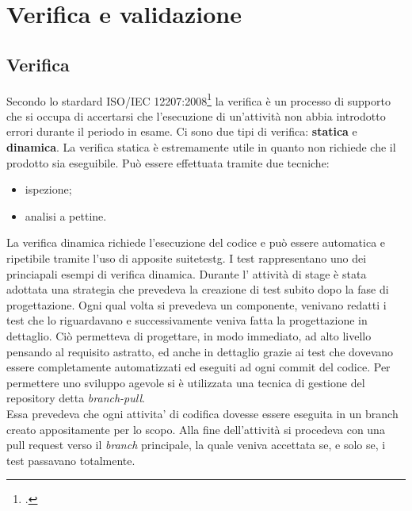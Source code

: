 
\chapter{Verifica e validazione}
\label{cap:verifica-validazione}
\section{Verifica}
Secondo lo stardard ISO/IEC 12207:2008\footcite{ISO:Systems-and-software-engineering} la verifica è un processo di supporto che si occupa di accertarsi che l’esecuzione di un'attività non abbia introdotto errori durante il periodo in esame. 
Ci sono due tipi di verifica: \textbf{statica} e \textbf{dinamica}.
La verifica statica è estremamente utile in quanto non richiede che il prodotto sia eseguibile. Può essere effettuata tramite due tecniche:
\begin{itemize}
    \item ispezione;
    \item analisi a pettine.
\end{itemize}
La verifica dinamica richiede l'esecuzione del codice e può essere automatica e ripetibile tramite l'uso di apposite \gls{suitetestg}\glsfirstoccur. I test rappresentano uno dei princiapali esempi di verifica dinamica. Durante l' attività di stage è stata adottata una strategia che prevedeva la creazione di test subito dopo la fase di progettazione. Ogni qual volta si prevedeva un componente, venivano redatti i test che lo riguardavano e successivamente veniva fatta la progettazione in dettaglio. Ciò permetteva di progettare, in modo immediato, ad alto livello pensando al requisito astratto, ed anche in dettaglio grazie ai test che dovevano essere completamente automatizzati ed eseguiti ad ogni commit del codice. 
Per permettere uno sviluppo agevole si è utilizzata una tecnica di gestione del repository detta \emph{branch-pull}.\\
Essa prevedeva che ogni attivita’ di codifica dovesse essere eseguita in un branch creato appositamente per lo scopo. Alla fine dell'attività si procedeva con una pull request verso il \emph{branch} principale, la quale veniva accettata se, e solo se, i test passavano totalmente. \\

